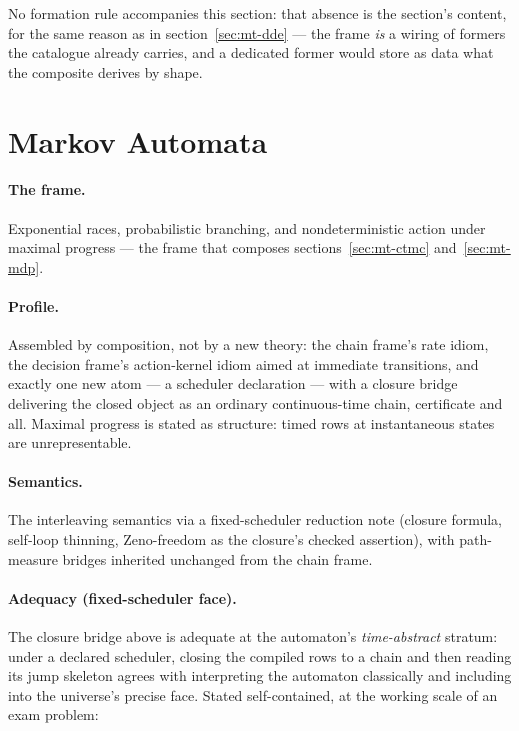 No formation rule accompanies this section: that absence is the
section's content, for the same reason as in
section~\ref{sec:mt-dde} --- the frame \emph{is} a wiring of formers
the catalogue already carries, and a dedicated former would store as
data what the composite derives by shape.

\section{Markov Automata}
\label{sec:mt-ma}

\paragraph{The frame.} Exponential races, probabilistic branching,
and nondeterministic action under maximal progress --- the frame that
composes sections~\ref{sec:mt-ctmc} and~\ref{sec:mt-mdp}.

\paragraph{Profile.} Assembled by composition, not by a new theory:
the chain frame's rate idiom, the decision frame's action-kernel
idiom aimed at immediate transitions, and exactly one new atom --- a
scheduler declaration --- with a closure bridge delivering the closed
object as an ordinary continuous-time chain, certificate and all.
Maximal progress is stated as structure: timed rows at instantaneous
states are unrepresentable.

\paragraph{Semantics.} The interleaving semantics via a
fixed-scheduler reduction note (closure formula, self-loop thinning,
Zeno-freedom as the closure's checked assertion), with path-measure
bridges inherited unchanged from the chain frame.

\paragraph{Adequacy (fixed-scheduler face).} The closure bridge above
is adequate at the automaton's \emph{time-abstract} stratum: under a
declared scheduler, closing the compiled rows to a chain and then
reading its jump skeleton agrees with interpreting the automaton
classically and including into the universe's precise face.  Stated
self-contained, at the working scale of an exam problem:

